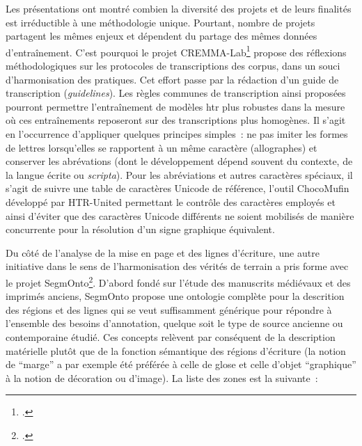 \documentclass[a4paper,12pt,twoside]{book}
\begin{document}
		Les présentations ont montré combien la diversité des projets et de
		leurs finalités est irréductible à une méthodologie unique. Pourtant,
		nombre de projets partagent les mêmes enjeux et dépendent du partage des
		mêmes données d'entraînement. C'est pourquoi le projet CREMMA-Lab\footcite{campsCremmaLabProjectsTranscription2022} propose des réflexions
		méthodologiques sur les protocoles de transcriptions des corpus, dans un
		souci d'harmonisation des pratiques. Cet effort passe par la rédaction
		d'un guide de transcription (\textit{guidelines}). Les règles communes de
		transcription ainsi proposées pourront permettre l'entraînement de
		modèles \gls{htr} plus robustes dans la mesure où ces entraînements reposeront
		sur des transcriptions plus homogènes. Il s'agit en l'occurrence
		d'appliquer quelques principes simples~: ne pas imiter les formes de
		lettres lorsqu'elles se rapportent à un même caractère (allographes) et
		conserver les abrévations (dont le développement dépend souvent du
		contexte, de la langue écrite ou \textit{scripta}). Pour les abréviations
		et autres caractères spéciaux, il s'agit de suivre une table de
		caractères Unicode de référence, l'outil ChocoMufin développé par
		HTR-United permettant le contrôle des caractères employés et ainsi
		d'éviter que des caractères Unicode différents ne soient mobilisés de
		manière concurrente pour la résolution d'un signe graphique équivalent.
		
		Du côté de l'analyse de la mise en page et des lignes d'écriture, une
		autre initiative dans le sens de l'harmonisation des vérités de terrain
		a pris forme avec le projet SegmOnto\footcite{gabaySegmOntoControlledVocabulary2022}. D'abord fondé sur l'étude
		des manuscrits médiévaux et des imprimés anciens, SegmOnto propose une
		ontologie complète pour la descrition des régions et des lignes qui se
		veut suffisamment générique pour répondre à l'ensemble des besoins
		d'annotation, quelque soit le type de source ancienne ou contemporaine
		étudié. Ces concepts relèvent par conséquent de la description
		matérielle plutôt que de la fonction sémantique des régions d'écriture
		(la notion de ``marge'' a par exemple été préférée à celle de glose et
		celle d'objet ``graphique'' à la notion de décoration ou d'image). La
		liste des zones est la suivante~:
		
\end{document}
